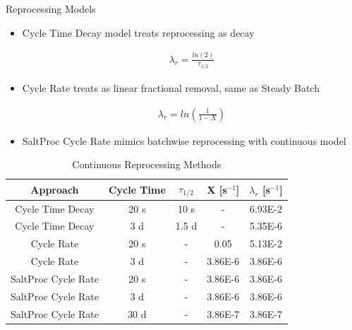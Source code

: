 \documentclass[final]{beamer}
\newlength{\onecolwid}
\newlength{\threecolwid}
\begin{document}
\begin{frame}[t]
\begin{columns}[t,totalwidth=\threecolwid]
\begin{column}{\onecolwid}
\begin{block}{Reprocessing Models}
\begin{itemize}
\begin{align*}	
\frac{dN_j}{dt}_{net} = \frac{dN_j}{dt}_{base} -  \lambda_{r, j} N_j + \sum_{mat} \lambda _{r, i \rightarrow j} N_i
\end{align*}
	\item Cycle Time Decay model treats reprocessing as decay

\begin{align*}
	\lambda_r = \frac{ln(2)}{\tau_{1/2}}
\end{align*}

	\item Cycle Rate treats as linear fractional removal, same as Steady Batch

\begin{align*}
	\lambda_r = ln \left( \frac{1}{1-X} \right)
\end{align*}
	\item SaltProc Cycle Rate mimics batchwise reprocessing with continuous model
\end{itemize}


\begin{table}[H]
\renewcommand{\arraystretch}{1.25}
\caption{Continuous Reprocessing Methods}
\label{tab:cont_methods}
\begin{center}
\begin{tabular}{ | c | c | c | c | c | }
 \hline
	Approach & Cycle Time & $\tau_{1/2}$ & X [s$^{-1}$] & $\lambda_{r}$ [s$^{-1}$]\\
 \hline
 \hline
 Cycle Time Decay & 20 s & 10 s & - & 6.93E-2\\
 Cycle Time Decay & 3 d & 1.5 d & - & 5.35E-6\\
 Cycle Rate & 20 s & - & 0.05 & 5.13E-2\\
 Cycle Rate & 3 d & - & 3.86E-6 & 3.86E-6\\
 SaltProc Cycle Rate & 20 s & - & 3.86E-6 & 3.86E-6\\
 SaltProc Cycle Rate & 3 d & - & 3.86E-6 & 3.86E-6\\
 SaltProc Cycle Rate & 30 d & - & 3.86E-7 & 3.86E-7\\
 
 \hline
\end{tabular}
\end{center}
\end{table}




\end{block}
\end{column}
\end{columns}
\end{frame}
\end{document}
